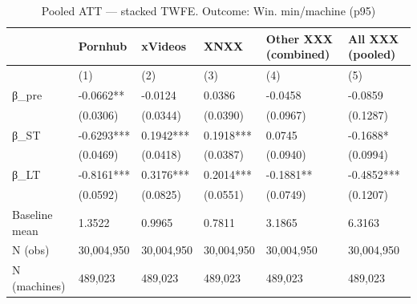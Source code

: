 \begin{table}

\caption{Pooled ATT — stacked TWFE. Outcome: Win. min/machine (p95)}
\centering
\begin{tabular}[t]{llllll}
\toprule
  & Pornhub & xVideos & XNXX & Other XXX (combined) & All XXX (pooled)\\
\midrule
 & (1) & (2) & (3) & (4) & (5)\\
β\_pre & -0.0662** & -0.0124 & 0.0386 & -0.0458 & -0.0859\\
 & (0.0306) & (0.0344) & (0.0390) & (0.0967) & (0.1287)\\
β\_ST & -0.6293*** & 0.1942*** & 0.1918*** & 0.0745 & -0.1688*\\
 & (0.0469) & (0.0418) & (0.0387) & (0.0940) & (0.0994)\\
\addlinespace
β\_LT & -0.8161*** & 0.3176*** & 0.2014*** & -0.1881** & -0.4852***\\
 & (0.0592) & (0.0825) & (0.0551) & (0.0749) & (0.1207)\\
Baseline mean & 1.3522 & 0.9965 & 0.7811 & 3.1865 & 6.3163\\
N (obs) & 30,004,950 & 30,004,950 & 30,004,950 & 30,004,950 & 30,004,950\\
N (machines) & 489,023 & 489,023 & 489,023 & 489,023 & 489,023\\
\bottomrule
\end{tabular}
\end{table}
